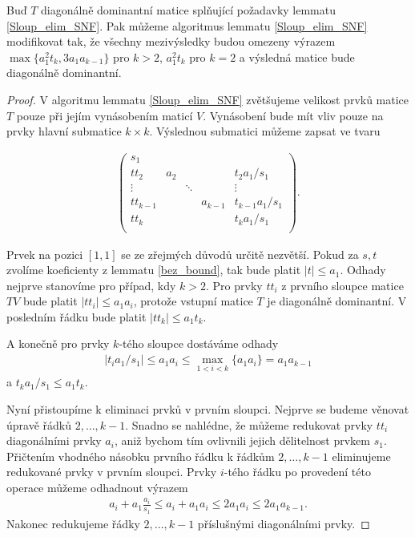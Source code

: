 \begin{lem}\label{Sloup_elim_SNF_modified}
Buď $ T $ diagonálně dominantní matice splňující požadavky lemmatu \ref{Sloup_elim_SNF}.
Pak můžeme algoritmus lemmatu \ref{Sloup_elim_SNF} modifikovat tak, že všechny
mezivýsledky budou omezeny výrazem 
$ \max\{ a_1^2 t_k, 3 a_1 a_{k - 1} \} $ pro $ k > 2 $, 
$ a_1^2 t_k $ pro $ k = 2 $
a výsledná matice bude diagonálně dominantní.
\end{lem}
\begin{proof}
V algoritmu lemmatu \ref{Sloup_elim_SNF} zvětšujeme velikost prvků matice $ T $
pouze při jejím vynásobením maticí $ V $. Vynásobení bude mít vliv pouze na
prvky hlavní submatice $ k \times k $. Výslednou submatici můžeme zapsat ve tvaru

\begin{align*}
    \left(
    \begin{array}{ccccc}
        s_1        &     &        &         &                 \\
        tt_2       & a_2 &        &         & t_2 a_1/s_1     \\
        \vdots     &     & \ddots &         & \vdots          \\
        tt_{k - 1} &     &        & a_{k-1} & t_{k-1} a_1/s_1 \\
        tt_k       &     &        &         & t_k a_1/s_1     \\
    \end{array}
    \right)
.
\end{align*}

Prvek na pozici $ [1,1] $ se ze zřejmých důvodů určitě nezvětší. Pokud za $ s, t $
zvolíme koeficienty z lemmatu \ref{bez_bound}, tak bude platit $ |t| \leq a_1 $.
Odhady nejprve stanovíme pro případ, kdy $ k > 2 $.
Pro prvky $ t t_i $ z prvního sloupce matice $ TV $ bude platit
$ |t t_i| \leq a_1 a_i $, protože vstupní matice $ T $ je diagonálně dominantní.
V posledním řádku bude platit $ |t t_k| \leq a_1 t_k $.

A konečně pro prvky $ k $-tého sloupce dostáváme odhady
\begin{align*}
|t_i a_1 / s_1| \leq a_1 a_i \leq \max\limits_{1 < i < k }\{ a_1 a_{i} \} = a_1 a_{k - 1}
\end{align*}
a $ t_k a_1 / s_1 \leq a_1 t_k $.

Nyní přistoupíme k eliminaci prvků v prvním sloupci. Nejprve se budeme věnovat
úpravě řádků $ 2, \dots, k - 1 $. Snadno se nahlédne, že můžeme redukovat prvky
$ t t_i $ diagonálními prvky $ a_i $, aniž bychom tím ovlivnili jejich dělitelnost
prvkem $ s_1 $. Přičtením vhodného násobku prvního řádku k řádkům 
$ 2, \dots, k - 1 $ eliminujeme redukované prvky v prvním sloupci. 
Prvky $ i $-tého řádku po provedení této operace můžeme odhadnout
výrazem 
\begin{align*}
    a_i + a_1 \frac{a_i}{s_1} 
    \leq a_i + a_1 a_i 
    \leq 2 a_1 a_i
    \leq 2 a_1 a_{k - 1}.
\end{align*}
Nakonec redukujeme řádky $ 2, \dots, k - 1 $ příslušnými diagonálními prvky.


\end{proof}
